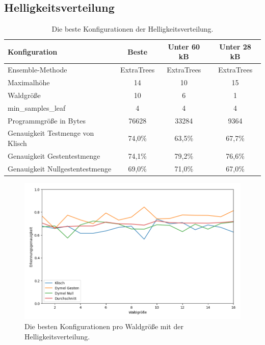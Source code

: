 \subsection{Helligkeitsverteilung}
\begin{table}[h!]
    \centering
    \begin{tabular}{ | l | c | c | c |}
        \hline
        Konfiguration & Beste & Unter 60 kB & Unter 28 kB \\\hline
        Ensemble-Methode & ExtraTrees & ExtraTrees & ExtraTrees \\\hline
        Maximalhöhe & 14 & 10 & 15 \\\hline
        Waldgröße & 10 & 6 & 1 \\\hline
        min\_samples\_leaf & 4 & 4 & 4 \\\hline
        Programmgröße in Bytes & 76628 & 33284 & 9364 \\\hline
        Genauigkeit Testmenge von Klisch & 74,0\% & 63,5\% & 67,7\% \\\hline
        Genauigkeit Gestentestmenge & 74,1\% & 79,2\% & 76,6\% \\\hline
        Genauigkeit Nullgestentestmenge & 69,0\% & 71,0\% & 67,0\% \\\hline
    \end{tabular}
    \caption{Die beste Konfigurationen der Helligkeitsverteilung.}
    \label{tab:helligkeitsverteilung}
\end{table}
\begin{figure}[h!]
    \centering
    \includegraphics[width=\linewidth]{images/helligkeitsverteilung_acc_per_size.png}
    \caption{Die besten Konfigurationen pro Waldgröße mit der Helligkeitsverteilung.}
    \label{fig:helligkeitsverteilung_per_forest_size}
\end{figure}
